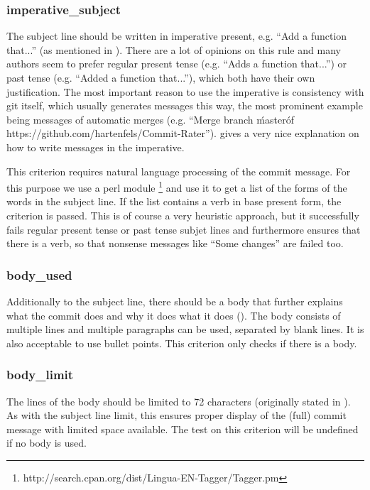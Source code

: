 \subsubsection{imperative\_subject}
\label{subs:imperative_subject}
The subject line should be written in imperative present, e.g. ``Add a function that...'' (as mentioned in \cite{OffGuide}). There are a lot of opinions on this rule and many authors seem to prefer regular present tense (e.g. ``Adds a function that...'') or past tense (e.g. ``Added a function that...''), which both have their own justification. The most important reason to use the imperative is consistency with git itself, which usually generates messages this way, the most prominent example being messages of automatic merges (e.g. ``Merge branch \'master\' of https://github.com/hartenfels/Commit-Rater''). \cite{CB} gives a very nice explanation on how to write messages in the imperative.

This criterion requires natural language processing of the commit
message. For this purpose we use a perl module \footnote{http://search.cpan.org/dist/Lingua-EN-Tagger/Tagger.pm} and use it to get a list of the forms of the words in the subject line. If the list contains a verb in base present form, the criterion is passed. This is of course a very heuristic approach, but it successfully fails regular present tense or past tense subjet lines and furthermore ensures that there is a verb, so that nonsense messages like ``Some changes'' are failed too.

\subsubsection{body\_used}
\label{subs:body_used}
Additionally to the subject line, there should be a body that further explains what the commit does and why it does what it does (\cite{OffGuide}). The body consists of multiple lines and multiple paragraphs can be used, separated by blank lines. It is also acceptable to use bullet points. This criterion only checks if there is a body.

\subsubsection{body\_limit}
\label{subs:body_limit}
The lines of the body should be limited to 72 characters (originally stated in \cite{TP}). As with the subject line limit, this ensures proper display of the (full) commit message with limited space available. The test on this criterion will be undefined if no body is used.


